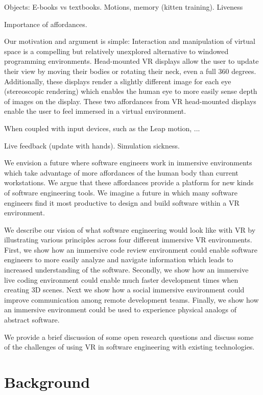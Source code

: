 \documentclass[conference]{IEEEtran}
\begin{document}
Objects: E-books vs textbooks.
Motions, memory (kitten training).
Liveness

Importance of affordances.

Our motivation and argument is simple: 
Interaction and manipulation of virtual space is a compelling but relatively unexplored alternative to windowed programming environments.
Head-mounted VR displays allow the user to update their view by moving their bodies or rotating their neck, even a full 360 degrees.
Additionally, these displays render a slightly different image for each eye (stereoscopic rendering) which enables the human eye to more easily sense depth of images on the display.
These two affordances from VR head-mounted displays enable the user to feel immersed in a virtual environment.

When coupled with input devices, such as the Leap motion, ...

Live feedback (update with hands).  Simulation sickness.

We envision a future where software engineers work in immersive environments which take advantage of more affordances of the human body than current workstations.
We argue that these affordances provide a platform for new kinds of software engineering tools. 
We imagine a future in which many software engineers find it most productive to design and build software within a VR environment. 


We describe our vision of what software engineering would look like with VR by illustrating various principles across four different immersive VR environments.
First, we show how an immersive code review environment could enable software engineers to more easily analyze and navigate information which leads to increased understanding of the software.
Secondly, we show how an immersive live coding environment could enable much faster development times when creating 3D scenes.
Next we show how a social immersive environment could improve communication among remote development teams.
Finally, we show how an immersive environment could be used to experience physical analogs of abstract software.

We provide a brief discussion of some open research questions and discuss some of the challenges of using VR in software engineering with existing technologies.



\section{Background}
\end{document}
